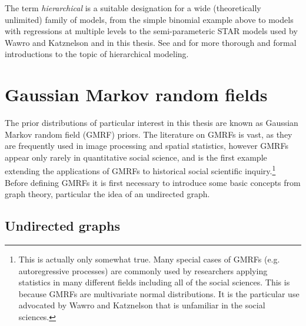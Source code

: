 The term {\it hierarchical} is a suitable designation for a wide (theoretically unlimited) family of models, from the simple binomial example above to models with regressions at multiple levels to the semi-parameteric STAR models used by Wawro and Katznelson and in this thesis. See  and  for more thorough and formal introductions to the topic of hierarchical modeling.  




\section{Gaussian Markov random fields}
\label{gmrf}

The prior distributions of particular interest in this thesis are known as Gaussian Markov random field (GMRF) priors. The literature on GMRFs is vast, as they are frequently used in image processing and spatial statistics, however GMRFs appear only rarely in quantitative social science, and  is the first example extending the applications of GMRFs to historical social scientific inquiry.\footnote{This is actually only somewhat true. Many special cases of GMRFs  (e.g. autoregressive processes) are commonly used by researchers applying statistics in many different fields including all of the social sciences. This is because GMRFs are  multivariate normal distributions. It is the particular use advocated by Wawro and Katznelson that is unfamiliar in the social sciences.} Before defining GMRFs it is first necessary to introduce some basic concepts from graph theory, particular the idea of an undirected graph. 

\subsection{Undirected graphs}
\label{undirected_graphs}

